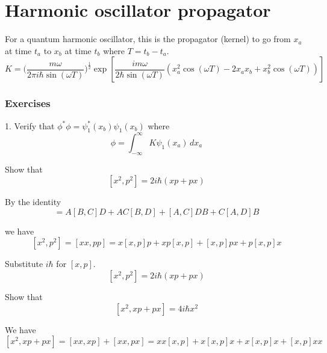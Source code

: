 

\section*{Harmonic oscillator propagator}

For a quantum harmonic oscillator, this is the propagator (kernel) to go from $x_a$ at time $t_a$
to $x_b$ at time $t_b$ where $T=t_b-t_a$.
\begin{equation*}
K=\biggl(\frac{m\omega}{2\pi i\hbar\sin(\omega T)}\biggr)^\frac{1}{2}
\exp\left[\frac{im\omega}{2\hbar\sin(\omega T)}
\left(
x_a^2\cos(\omega T)-2x_ax_b+x_b^2\cos(\omega T)
\right)
\right]
\end{equation*}

\subsubsection*{Exercises}

1. Verify that $\phi^*\phi=\psi_1^*(x_b)\psi_1(x_b)$ where
\begin{equation*}
\phi=\int_{-\infty}^\infty K\psi_1(x_a)\,dx_a
\end{equation*}




Show that
\begin{equation*}
\left[x^2,p^2\right]=2i\hbar(xp+px)
\tag{1}
\end{equation*}

By the identity
\begin{equation*}
[AB,CD]=A[B,C]D+AC[B,D]+[A,C]DB+C[A,D]B
\end{equation*}

we have
\begin{equation*}
\left[x^2,p^2\right]=[xx,pp]=x[x,p]p+xp[x,p]+[x,p]px+p[x,p]x
\end{equation*}

Substitute $i\hbar$ for $[x,p]$.
\begin{equation*}
\left[x^2,p^2\right]=2i\hbar(xp+px)
\end{equation*}

Show that
\begin{equation*}
\left[x^2,xp+px\right]=4i\hbar x^2
\tag{2}
\end{equation*}

We have
\begin{equation*}
\left[x^2,xp+px\right]=[xx,xp]+[xx,px]
=xx[x,p]+x[x,p]x+x[x,p]x+[x,p]xx
\end{equation*}

